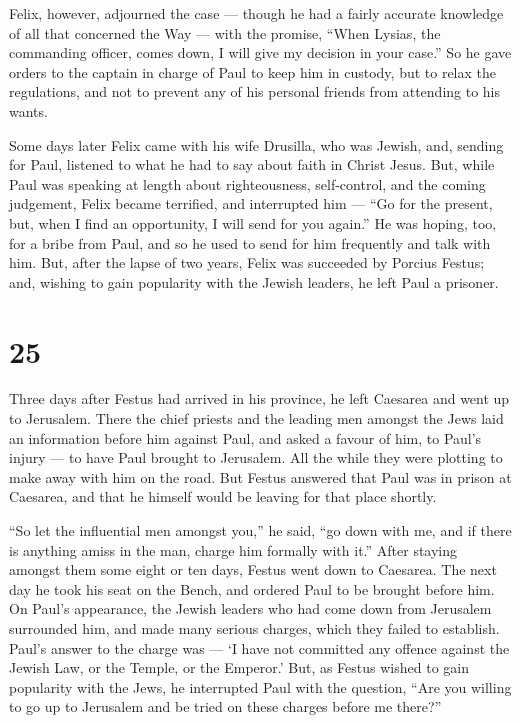  Felix, however, adjourned the case --- though he had a
fairly accurate knowledge of all that concerned the Way --- with the
promise, ``When Lysias, the commanding officer, comes down, I will give
my decision in your case.''  So he gave orders to the
captain in charge of Paul to keep him in custody, but to relax the
regulations, and not to prevent any of his personal friends from
attending to his wants.

 Some days later Felix came with his wife Drusilla, who was
Jewish, and, sending for Paul, listened to what he had to say about
faith in Christ Jesus.  But, while Paul was speaking at
length about righteousness, self-control, and the coming judgement,
Felix became terrified, and interrupted him --- ``Go for the present,
but, when I find an opportunity, I will send for you again.''
 He was hoping, too, for a bribe from Paul, and so he used
to send for him frequently and talk with him.  But, after
the lapse of two years, Felix was succeeded by Porcius Festus; and,
wishing to gain popularity with the Jewish leaders, he left Paul a
prisoner.

\hypertarget{section-24}{%
\section{25}\label{section-24}}

 Three days after Festus had arrived in his province, he
left Caesarea and went up to Jerusalem.  There the chief
priests and the leading men amongst the Jews laid an information before
him against Paul,  and asked a favour of him, to Paul's
injury --- to have Paul brought to Jerusalem. All the while they were
plotting to make away with him on the road.  But Festus
answered that Paul was in prison at Caesarea, and that he himself would
be leaving for that place shortly.

 ``So let the influential men amongst you,'' he said, ``go
down with me, and if there is anything amiss in the man, charge him
formally with it.''  After staying amongst them some eight
or ten days, Festus went down to Caesarea. The next day he took his seat
on the Bench, and ordered Paul to be brought before him.  On
Paul's appearance, the Jewish leaders who had come down from Jerusalem
surrounded him, and made many serious charges, which they failed to
establish.  Paul's answer to the charge was --- `I have not
committed any offence against the Jewish Law, or the Temple, or the
Emperor.'  But, as Festus wished to gain popularity with the
Jews, he interrupted Paul with the question, ``Are you willing to go up
to Jerusalem and be tried on these charges before me there?''

